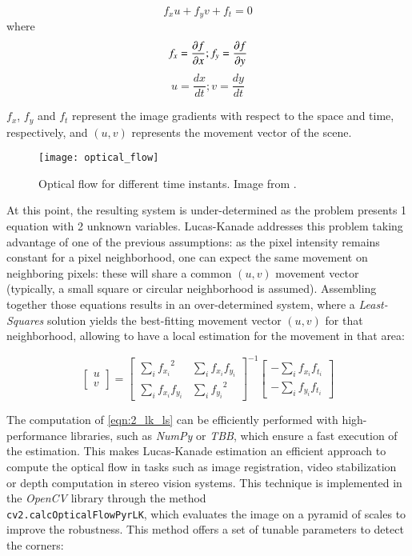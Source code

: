 $$
f_xu+ f_yv + f_t = 0
$$
where
$$
f_x = \frac{\partial f}{\partial x} ; f_y = \frac{\partial f}{\partial y}\\
$$
$$
u = \frac{dx}{dt} ; v = \frac{dy}{dt}
$$

$f_x$, $f_y$ and $f_t$ represent the image gradients with respect to the space and time, respectively, and $(u, v)$ represents the movement vector of the scene.

\begin{figure}[h]
	\centering
	\texttt{[image: optical\_flow]}
	\caption{Optical flow for different time instants. Image from \cite{lucas_kanade_tutorial}.}
	\label{fig:2_optical_flow}
\end{figure}

At this point, the resulting system is under-determined as the problem presents 1 equation with 2 unknown variables. Lucas-Kanade addresses this problem taking advantage of one of the previous assumptions: as the pixel intensity remains constant for a pixel neighborhood, one can expect the same movement on neighboring pixels: these will share a common $(u, v)$ movement vector (typically, a small square or circular neighborhood is assumed). Assembling together those equations results in an over-determined system, where a \textit{Least-Squares} solution yields the best-fitting movement vector $(u,v)$ for that neighborhood, allowing to have a local estimation for the movement in that area:

\begin{equation}
\begin{bmatrix} u \\ v \end{bmatrix} = \begin{bmatrix} \sum_{i}{f_{x_i}}^2 & \sum_{i}{f_{x_i} f_{y_i} } \\ \sum_{i}{f_{x_i} f_{y_i}} & \sum_{i}{f_{y_i}}^2 \end{bmatrix}^{-1} \begin{bmatrix} - \sum_{i}{f_{x_i} f_{t_i}} \\ - \sum_{i}{f_{y_i} f_{t_i}} \end{bmatrix}
\label{eqn:2_lk_ls}
\end{equation}

The computation of \autoref{eqn:2_lk_ls} can be efficiently performed with high-performance libraries, such as \textit{NumPy} or \textit{TBB}, which ensure a fast execution of the estimation. This makes Lucas-Kanade estimation an efficient approach to compute the optical flow in tasks such as image registration, video stabilization or depth computation in stereo vision systems. This technique is implemented in the \textit{OpenCV} library through the method\\ \texttt{cv2.calcOpticalFlowPyrLK}, which evaluates the image on a pyramid of scales to improve the robustness. This method offers a set of tunable parameters to detect the corners:

